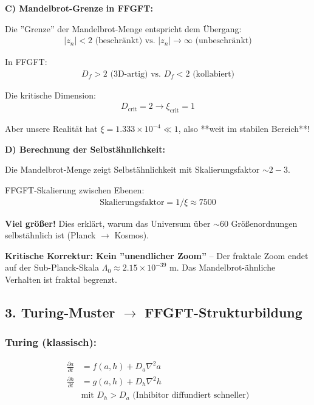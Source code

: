 \textbf{C) Mandelbrot-Grenze in FFGFT:}

Die ''Grenze'' der Mandelbrot-Menge entspricht dem Übergang:
\begin{align*}
	|z_n| < 2 \text{ (beschränkt) vs. } |z_n| \to \infty \text{ (unbeschränkt)}
\end{align*}

In FFGFT:
\begin{align*}
	D_f > 2 \text{ (3D-artig) vs. } D_f < 2 \text{ (kollabiert)}
\end{align*}

Die kritische Dimension:
\begin{align*}
	D_{\text{crit}} = 2 \rightarrow \xi_{\text{crit}} = 1
\end{align*}

Aber unsere Realität hat $\xi = 1.333 \times 10^{-4} \ll 1$, also **weit im stabilen Bereich**!

\textbf{D) Berechnung der Selbstähnlichkeit:}

Die Mandelbrot-Menge zeigt Selbstähnlichkeit mit Skalierungsfaktor $\sim 2-3$.

FFGFT-Skalierung zwischen Ebenen:
\begin{align*}
	\text{Skalierungsfaktor} = 1/\xi \approx 7500
\end{align*}

\textbf{Viel größer!} Dies erklärt, warum das Universum über $\sim 60$ Größenordnungen selbstähnlich ist (Planck $\to$ Kosmos).

\textbf{Kritische Korrektur: Kein ''unendlicher Zoom''} – Der fraktale Zoom endet auf der Sub-Planck-Skala $\Lambda_0 \approx 2.15 \times 10^{-39}$ m. Das Mandelbrot-ähnliche Verhalten ist fraktal begrenzt.

\subsection*{3. Turing-Muster $\rightarrow$ FFGFT-Strukturbildung}

\subsubsection*{Turing (klassisch):}
\begin{align*}
	\frac{\partial a}{\partial t} &= f(a,h) + D_a \nabla^2 a \\
	\frac{\partial h}{\partial t} &= g(a,h) + D_h \nabla^2 h \\
	&\text{mit } D_h > D_a \text{ (Inhibitor diffundiert schneller)}
\end{align*}

